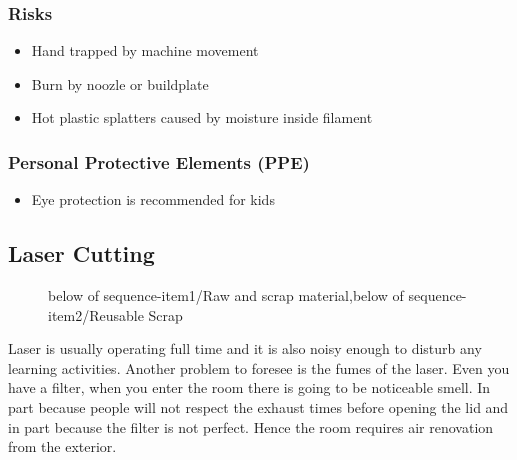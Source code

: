\documentclass[a4paper,12pt,titlepage]{article}
\begin{document}
\subsubsection*{Risks}
\begin{itemize}
\item Hand trapped by machine movement
\item Burn by noozle or buildplate
\item Hot plastic splatters caused by moisture inside filament
\end{itemize}
\subsubsection*{Personal Protective Elements (PPE)}
\begin{itemize}
\item Eye protection is recommended for kids
\end{itemize}
\clearpage


\subsection{Laser Cutting}
\begin{figure}[h]

\centering
{}
{below of sequence-item1/{Raw and scrap material},below of sequence-item2/Reusable Scrap}
\vspace{1cm}
\end{figure}
\vspace{0.3cm}
Laser is usually operating full time and it is also noisy enough to disturb any learning activities. Another problem to foresee is the fumes of the laser. Even you have a filter, when you enter the room there is going to be noticeable smell. In part because people will not respect the exhaust times before opening the lid and in part because the filter is not perfect. Hence the room requires air renovation from the exterior.
\end{document}
